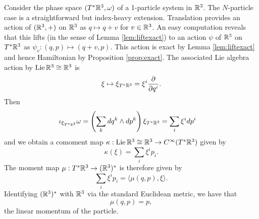 \documentclass{amsart}
\begin{document}
\begin{example}
    Consider the phase space $(T^*\mathbb{R}^3,\omega)$ of a 1-particle system in $\mathbb{R}^3$. 
    The $N$-particle case is a straightforward but index-heavy extension.
    Translation provides an action of $(\mathbb{R}^3,+)$ on $\mathbb{R}^3$ as $q\mapsto q+v$
    for $v\in\mathbb{R}^3$. An easy computation reveals that this lifts (in the sense of Lemma
    \ref{lem:liftexact}) to an action $\psi$ of $\mathbb{R}^3$ on $T^*\mathbb{R}^3$ as $\psi_v:(q,p)\mapsto(q+v,p)$.
    This action is exact by Lemma \ref{lem:liftexact} and hence Hamiltonian by Proposition
    \ref{prop:exact}. The associated Lie algebra action by $\operatorname{Lie}\mathbb{R}^3\cong\mathbb{R}^3$ is
    \begin{equation*}
        \xi \mapsto \xi_{T^*\mathbb{R}^{3}}=\xi^i\frac{\partial}{\partial q^i}.
    \end{equation*}
    Then
    \begin{align*}
        \iota_{\xi_{T^*\mathbb{R}^3}}\omega &= \left( \sum_k dq^k\wedge dp^k \right)\xi_{T^*\mathbb{R}^3} = \sum_i\xi^idp^i
    \end{align*}
    and we obtain a comoment map $\kappa:\operatorname{Lie}\mathbb{R}^3\cong\mathbb{R}^3\to C^\infty(T^*\mathbb{R}^3)$ given by
    \begin{equation*}
        \kappa(\xi) = \sum_i\xi^i p_i.
    \end{equation*}
    The moment map $\mu:T^*\mathbb{R}^3\to(\mathbb{R}^3)^*$ is therefore given by
    \begin{equation*}
        \sum_i\xi^ip_i = \langle \mu(q,p), \xi\rangle.
    \end{equation*}
    Identifying $(\mathbb{R}^3)^*$ with $\mathbb{R}^3$ via the standard Euclidean metric, we have that
    \begin{equation*}
        \mu(q,p) = p,
    \end{equation*}
    the linear momentum of the particle.
\end{example}
\end{document}
